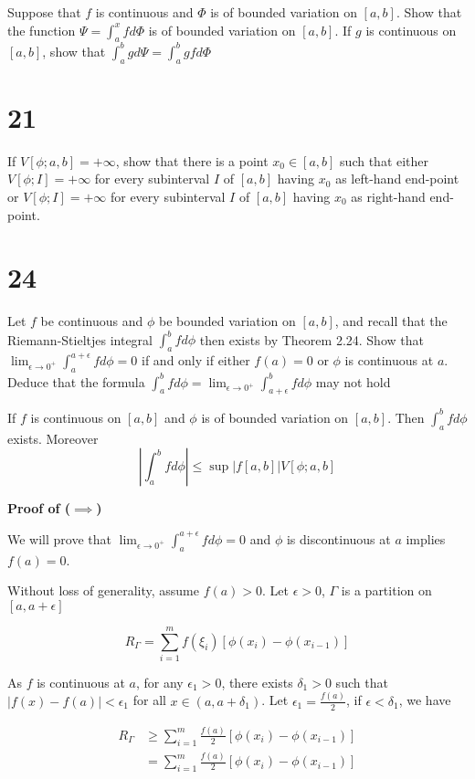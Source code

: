 \documentclass{article}
\begin{document}
Suppose that $f$ is continuous and $\Phi$ is of bounded variation on $[a, b]$. Show that the function $\Psi = \int_a^x f d\Phi$ is of bounded variation on $[a, b]$. If $g$ is continuous on $[a, b]$, show that $\int_a^b g d\Psi = \int_a^b gf d\Phi$

\section*{21}
If $V[\phi; a, b] = +\infty$, show that there is a point $x_0 \in [a, b]$ such that either $V[\phi; I] = +\infty$ for every subinterval $I$ of $[a, b]$ having $x_0$ as left-hand end-point or $V[\phi; I] = +\infty$ for every subinterval $I$ of $[a, b]$ having $x_0$ as right-hand end-point. 


\section*{24}
Let $f$ be continuous and $\phi$ be bounded variation on $[a, b]$, and recall that the Riemann-Stieltjes integral $\int_a^b fd\phi$ then exists by Theorem 2.24. Show that $\lim_{\epsilon \to 0^+} \int_a^{a + \epsilon} f d\phi = 0$ if and only if either $f(a) = 0$ or $\phi$ is continuous at $a$. Deduce that the formula $\int_a^b fd\phi = \lim_{\epsilon \to 0^+} \int_{a + \epsilon}^b f d\phi$ may not hold

\begin{theorem}[Theorem 2.24]
    If $f$ is continuous on $[a, b]$ and $\phi$ is of bounded variation on $[a, b]$. Then $\int_a^b f d\phi$ exists. Moreover
    $$
        \left| \int_a^b f d\phi \right| \leq \sup |f[a, b]| V[\phi; a, b]
    $$
\end{theorem}

\textbf{Proof of ($\implies$)}

We will prove that $\lim_{\epsilon \to 0^+} \int_a^{a + \epsilon} f d\phi = 0$ and $\phi$ is discontinuous at $a$ implies $f(a) = 0$.

Without loss of generality, assume $f(a) > 0$. Let $\epsilon > 0$, $\Gamma$ is a partition on $[a, a+\epsilon]$

$$
    R_\Gamma = \sum_{i=1}^m f(\xi_i) [\phi(x_i) - \phi(x_{i-1})]
$$


As $f$ is continuous at $a$, for any $\epsilon_1 > 0$, there exists $\delta_1 > 0$ such that $|f(x) - f(a)| < \epsilon_1$ for all $x \in (a, a + \delta_1)$.
Let $\epsilon_1 = \frac{f(a)}{2}$, if $\epsilon < \delta_1$, we have

\begin{align*}
    R_\Gamma
        &\geq \sum_{i=1}^m \frac{f(a)}{2} [\phi(x_i) - \phi(x_{i-1})] \\
        &= \sum_{i=1}^m \frac{f(a)}{2} [\phi(x_i) - \phi(x_{i-1})]
\end{align*}
    
\end{document}
